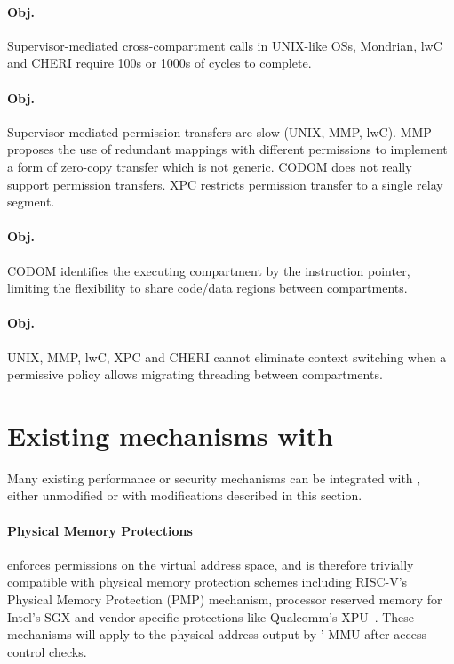 \paragraph{Obj. }
Supervisor-mediated cross-compartment calls in UNIX-like OSs,
Mondrian, lwC and CHERI require 100s or 1000s of cycles to complete.

\paragraph{Obj. }
Supervisor-mediated permission transfers are slow (UNIX, MMP, lwC).
MMP proposes the use of redundant mappings with different permissions
to implement a form of zero-copy transfer which is not generic.
CODOM does not really support permission transfers.
XPC restricts permission transfer to a single relay segment.

\paragraph{Obj. }
CODOM identifies the executing compartment by the instruction pointer, 
limiting the flexibility to share code/data regions between compartments.

\paragraph{Obj. }
UNIX, MMP, lwC, XPC and CHERI cannot eliminate context switching when a
permissive policy allows migrating threading between compartments.

\section{Existing mechanisms with \seccells}
\label{app:seccells:integrate_exist}
Many existing performance or security mechanisms can be integrated with
\seccells, either unmodified or with modifications described in this section.

\paragraph{Physical Memory Protections}
\seccells enforces permissions on the virtual address space, and is therefore
trivially compatible with physical memory protection schemes 
including RISC-V's Physical Memory Protection (PMP) mechanism, 
processor reserved memory for Intel's SGX
and vendor-specific protections like Qualcomm's XPU~\cite{qualcomm_ac}.
These mechanisms will apply to the physical address output by 
\seccells' MMU after \ptable access control checks.

